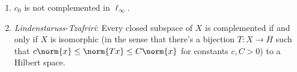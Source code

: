 \documentclass[10pt, twoside]{book}
\begin{document}
\begin{fact}
\begin{enumerate}
\item $c_0$ is not complemented in $\ell_\infty$.
\item \emph{Lindenstaruss-Tzafriri}: Every closed subspace of $X$ is complemented if and only if $X$ is isomorphic (in the sense that there's a bijection $T \colon X \to H$ such that $c\norm{x} \leq \norm{Tx} \leq C\norm{x}$ for constants $c,C > 0$) to a Hilbert space.
\end{enumerate}
\end{fact}

\end{document}
